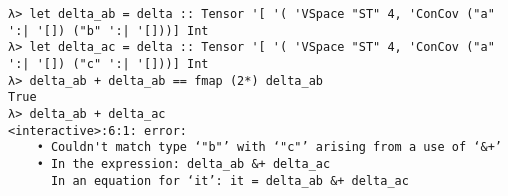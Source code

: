 \begin{code}
  \begin{verbatim}
λ> let delta_ab = delta :: Tensor '[ '( 'VSpace "ST" 4, 'ConCov ("a" ':| '[]) ("b" ':| '[]))] Int
λ> let delta_ac = delta :: Tensor '[ '( 'VSpace "ST" 4, 'ConCov ("a" ':| '[]) ("c" ':| '[]))] Int
λ> delta_ab + delta_ab == fmap (2*) delta_ab
True
λ> delta_ab + delta_ac
<interactive>:6:1: error:
    • Couldn't match type ‘"b"’ with ‘"c"’ arising from a use of ‘&+’
    • In the expression: delta_ab &+ delta_ac
      In an equation for ‘it’: it = delta_ab &+ delta_ac
  \end{verbatim}
  \label{repl_addition}
\end{code}

\newpage

